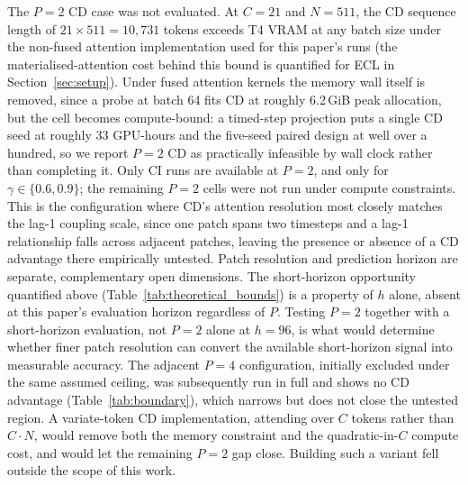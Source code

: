 \documentclass[10pt]{article} %
\begin{document}
    The $P = 2$ CD case was not evaluated. At $C = 21$ and $N = 511$, the CD sequence length of $21 \times 511 = 10{,}731$
    tokens exceeds T4 VRAM at any batch size under the non-fused attention implementation used for this paper's runs (the
    materialised-attention cost behind this bound is quantified for ECL in Section~\ref{sec:setup}). Under fused attention
    kernels the memory wall itself is removed, since a probe at batch 64 fits CD at roughly 6.2\,GiB peak allocation, but the
    cell becomes compute-bound: a timed-step projection puts a single CD seed at roughly 33 GPU-hours and the five-seed
    paired design at well over a hundred, so we report $P = 2$ CD as practically infeasible by wall clock rather than
    completing it. Only CI runs are
    available at $P = 2$, and only for $\gamma \in \{0.6, 0.9\}$; the remaining $P = 2$ cells were not run under compute
    constraints. This is the configuration where CD's attention resolution most closely matches the lag-1 coupling scale,
    since one patch spans two timesteps and a lag-1 relationship falls across adjacent patches, leaving the presence or
    absence of a CD advantage there empirically untested. Patch resolution and prediction horizon are separate, complementary
    open dimensions. The short-horizon opportunity quantified above (Table~\ref{tab:theoretical_bounds}) is a property of
    $h$ alone, absent at this paper's evaluation horizon regardless of $P$. Testing $P = 2$ together with a short-horizon
    evaluation, not $P = 2$ alone at $h = 96$, is what would determine whether finer patch resolution can convert the
    available short-horizon signal into measurable accuracy. The adjacent $P = 4$ configuration, initially excluded under
    the same assumed ceiling, was subsequently run in full and shows no CD advantage (Table~\ref{tab:boundary}), which
    narrows but does not close the untested region. A variate-token CD implementation, attending over $C$ tokens rather
    than $C \cdot N$, would remove both the memory constraint and the quadratic-in-$C$ compute cost, and would let the
    remaining $P = 2$ gap close. Building such a
    variant fell outside the scope of this work.
\end{document}
